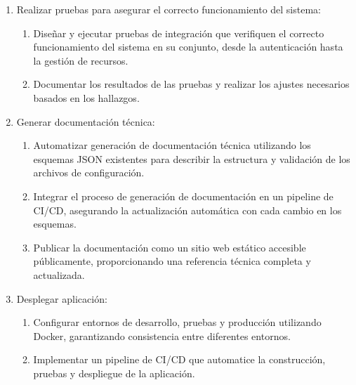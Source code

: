 \begin{enumerate}[label=\arabic*., itemindent=*, leftmargin=*]
    \item Realizar pruebas para asegurar el correcto funcionamiento del sistema:
          \begin{enumerate}[label=\arabic{enumi}.\arabic*., leftmargin=*]
              \item Diseñar y ejecutar pruebas de integración que verifiquen el correcto funcionamiento del sistema en su conjunto, desde la autenticación hasta la gestión de recursos.
              \item Documentar los resultados de las pruebas y realizar los ajustes necesarios basados en los hallazgos.
          \end{enumerate}

    \item Generar documentación técnica:
          \begin{enumerate}[label=\arabic{enumi}.\arabic*., leftmargin=*]
              \item Automatizar generación de documentación técnica utilizando los esquemas JSON existentes para describir la estructura y validación de los archivos de configuración.
              \item Integrar el proceso de generación de documentación en un pipeline de CI/CD, asegurando la actualización automática con cada cambio en los esquemas.
              \item Publicar la documentación como un sitio web estático accesible públicamente, proporcionando una referencia técnica completa y actualizada.
          \end{enumerate}

    \item Desplegar aplicación:
          \begin{enumerate}[label=\arabic{enumi}.\arabic*., leftmargin=*]
              \item Configurar entornos de desarrollo, pruebas y producción utilizando Docker, garantizando consistencia entre diferentes entornos.
              \item Implementar un pipeline de CI/CD que automatice la construcción, pruebas y despliegue de la aplicación.
          \end{enumerate}
\end{enumerate}
